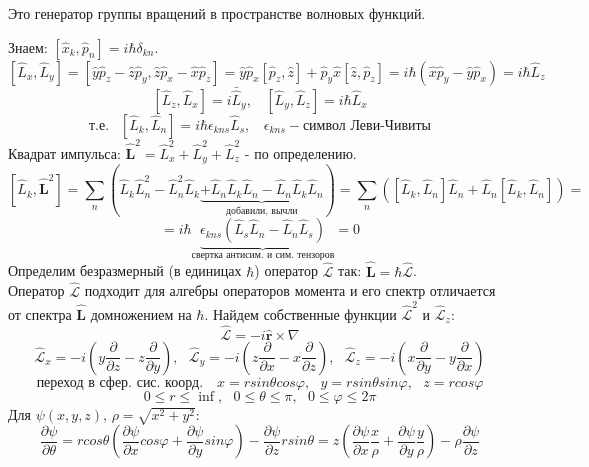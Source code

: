 	\hfill
	\begin{minipage}{0.35\textwidth}
		Это генератор группы вращений в пространстве волновых функций.
	\end{minipage}
	\noindent Знаем: $[\hat{x}_k, \hat{p}_n] = i\hbar \delta_{kn}$.\\
	$$
		[\hat{L}_x, \hat{L}_y] = [\hat{y}\hat{p}_z - \hat{z}\hat{p}_y,\hat{z}\hat{p}_x - \hat{x}\hat{p}_z] = \hat{y}\hat{p}_x[\hat{p}_z, \hat{z}] + \hat{p}_y\hat{x}[\hat{z},\hat{p}_z] = i\hbar(\hat{x}\hat{p}_y - \hat{y}\hat{p}_x) = i\hbar \hat{L}_z 
	$$
	$$
		[\hat{L}_z, \hat{L}_x] = i\bar\hat{L}_y, \ \ \ \ [\hat{L}_y, \hat{L}_z] = i\hbar\hat{L}_x
	$$
	$$
		\text{т.е.  }  \ \ [\hat{L}_k, \hat{L}_n] = i\hbar\epsilon_{kns}\hat{L}_s, \ \ \ \ \epsilon_{kns} - \text{символ Леви-Чивиты}
	$$
	Квадрат импульса: $\hat{\textbf{L}}^2 = \hat{L}^2_x + \hat{L}^2_y + \hat{L}^2_z$ - по определению. \\
	$$
		[\hat{L}_k, \hat{\textbf{L}}^2] = \sum_n (\hat{L}_k\hat{L}^2_n - \hat{L}^2_n\hat{L}_k \underbrace{+ \hat{L}_n\hat{L}_k\hat{L}_n - \hat{L}_n\hat{L}_k\hat{L}_n}_{\text{добавили, вычли}}) = \sum_n ([\hat{L}_k, \hat{L}_n]\hat{L}_n + \hat{L}_n[\hat{L}_k, \hat{L}_n]) = 
	$$
	$$
		= i\hbar\underbrace{\epsilon_{kns} (\hat{L}_s\hat{L}_n - \hat{L}_n\hat{L}_s)}_{\text{свертка антисим. и сим. тензоров}} = 0
	$$
	Определим безразмерный (в единицах $\hbar$) оператор $\hat{\mathcal{L}}$ так: $\hat{\textbf{L}} = \hbar\hat{\mathcal{L}}$. \\
	Оператор $\hat{\mathcal{L}}$ подходит для алгебры операторов момента и его спектр отличается от спектра $\hat{\textbf{L}}$ домножением на $\hbar$. Найдем собственные функции $\hat{\mathcal{L}}^2$ и $\hat{\mathcal{L}}_z$:
	$$
		\hat{\mathcal{L}} = -i\hat{\textbf{r}}\times\nabla
	$$
	$$
		\hat{\mathcal{L}}_x = -i\left(y\frac{\partial}{\partial z} - z\frac{\partial}{\partial y}\right), \ \ \ \hat{\mathcal{L}}_y = -i\left(z\frac{\partial}{\partial x} - x\frac{\partial}{\partial z}\right), \ \ \ \hat{\mathcal{L}}_z = -i\left(x\frac{\partial}{\partial y} - y\frac{\partial}{\partial x}\right)
	$$
	$$
		\text{переход в сфер. сис. коорд. } \ \ \ x = rsin\theta cos\varphi, \ \ \ y = rsin\theta sin\varphi, \ \ \ z = rcos\varphi 	
	$$
	$$
		0 \le r \le \inf, \ \ \ 0 \le \theta \le \pi, \ \ \ 0 \le \varphi \le 2\pi 
	$$
	Для $\psi(x,y,z)$, $\rho = \sqrt{x^2+y^2}$:
	$$
		\frac{\partial\psi}{\partial\theta} = rcos\theta\left(\frac{\partial\psi}{\partial x}cos\varphi + \frac{\partial\psi}{\partial y}sin\varphi\right) - \frac{\partial\psi}{\partial z}rsin\theta = z\left(\frac{\partial\psi}{\partial x}\frac{x}{\rho} + \frac{\partial\psi}{\partial y}\frac{y}{\rho}\right) - \rho\frac{\partial\psi}{\partial z}
	$$
